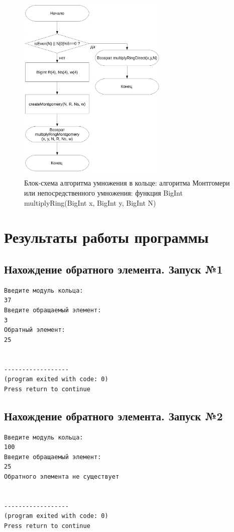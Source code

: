 \documentclass[a4paper,12pt]{article} %
\begin{document}
\begin{figure}[ht]
	\centering
	\includegraphics[width=0.64\textwidth]{lr5_multiplyRing.pdf}
	\caption{
		Блок-схема алгоритма умножения в кольце: алгоритма Монтгомери или непосредственного умножения:
		функция BigInt multiplyRing(BigInt x, BigInt y, BigInt N)
	}
	\label{bs_lr5_multiplyRing}
\end{figure}



\clearpage

\section*{Результаты работы программы}

\subsection*{Нахождение обратного элемента. Запуск №1}
\begin{verbatim}
Введите модуль кольца:
37
Введите обращаемый элемент:
3
Обратный элемент:
25


------------------
(program exited with code: 0)
Press return to continue
\end{verbatim}

\subsection*{Нахождение обратного элемента. Запуск №2}
\begin{verbatim}
Введите модуль кольца:
100
Введите обращаемый элемент:
25
Обратного элемента не существует


------------------
(program exited with code: 0)
Press return to continue
\end{verbatim}
\end{document}

